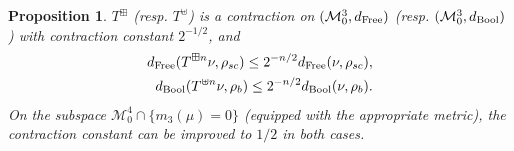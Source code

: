 \documentclass{amsart}
\newtheorem{proposition}[theorem]{Proposition}
\theoremstyle{definition}
\theoremstyle{remark}
\numberwithin{equation}{section}
\begin{document}
\begin{proposition}\label{contract}
    $T^{\boxplus}$ (resp. $T^{\uplus}$) is a contraction on $(\mathcal{M}_0^3,d_{\text{\normalfont Free}})$ (resp. $(\mathcal{M}_0^{3},d_{\text{\normalfont Bool}})$) with contraction constant $ 2^{-1/2}$, and 
    \begin{align}\label{iter}
        d_{\text{\normalfont Free}}(T^{\boxplus n}\nu, \rho_{sc})\leq2^{-n/2}d_\text{\normalfont Free}(\nu,\rho_{sc}), \\
        d_{\text{\normalfont Bool}}(T^{\uplus n}\nu, \rho_b)\leq2^{-n/2}d_\text{\normalfont Bool}(\nu,\rho_b)\label{iter2}.
    \end{align}
    On the subspace $\mathcal{M}_0^4\cap \{m_3(\mu)=0\}$ (equipped with the appropriate metric), the contraction constant can be improved to $1/2$ in both cases.
\end{proposition}
\end{document}
